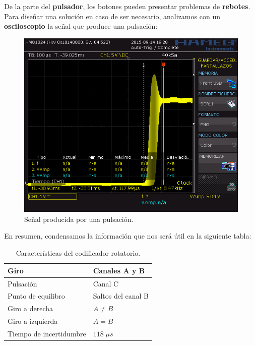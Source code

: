 De la parte del \textbf{pulsador}, los botones pueden presentar problemas de \textbf{rebotes}. Para diseñar una solución en caso de ser necesario, analizamos con un \textbf{osciloscopio} la señal que produce una pulsación:

\smallskip

\begin{figure}[H]
	\noindent \begin{centering}
		\includegraphics[width=\linewidth*2/3]{capitulo3/rebotes}
		\par\end{centering}
	\smallskip
	\caption{\label{fig:rebotes} Señal producida por una pulsación.}
\end{figure} 

\smallskip

En resumen, condensamos la información que nos será útil en la siguiente tabla:

\smallskip

\begin{table}[H]
	\begin{center}
		\begin{tabular}{|l|l|}
			\hline Giro & Canales A y B \\ 
			\hline Pulsación & Canal C \\ 
			\hline Punto de equilibro & Saltos del canal B \\ 
			\hline Giro a derecha & $A\neq B$ \\ 
			\hline Giro a izquierda & $A=B$ \\
			\hline Tiempo de incertidumbre & $118 \; \mu s$\\
			\hline 
		\end{tabular}
		\smallskip
		\caption{\label{tab:info_rotary} Características del codificador rotatorio.}
	\end{center}
\end{table}


